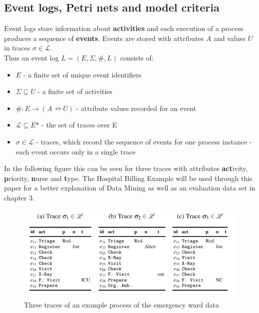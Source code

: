 \subsection{Event logs, Petri nets and model criteria}
Event logs store information about \textbf{activities} and each execution of a process produces a sequence of \textbf{events}. Events are stored with attributes $A$ and values $U$ in traces $\sigma \in \mathscr{L}$.\\
Thus an event log $L = (E, \Sigma, \#, L)$ consists of:


\begin{itemize}
\setlength{\itemsep}{3pt}
\item{$E$ - a finite set of unique event identifiers}
\item{$\Sigma \subseteq U$ - a finite set of activities}
\item{$\# : E \rightarrow (A \nrightarrow U)$ - attribute values recorded for an event}
\item{$\mathscr{L} \subseteq E\text{*}$ - the set of traces over E}
\item{$\sigma \in \mathscr{L}$ - traces, which record the sequence of events for
one process instance - each event occurs only in a single trace}
\end{itemize}

\noindent In the following figure this can be seen for three traces with attributes \textbf{act}ivity, \textbf{p}riority, \textbf{n}urse and \textbf{t}ype. The Hospital Billing Example will be used through this paper for a better explanation of Data Mining as well as an evaluation data set in chapter 3. \protect\cite{Mannhardt17}

\begin{figure}[H]
\includegraphics[width=14cm]{Chapters/Graphics_Paper/Event_Traces_ex_HB.jpg}
\caption{Three traces of an example process of the emergency ward data \protect\cite{Mannhardt17}} 
\end{figure}

